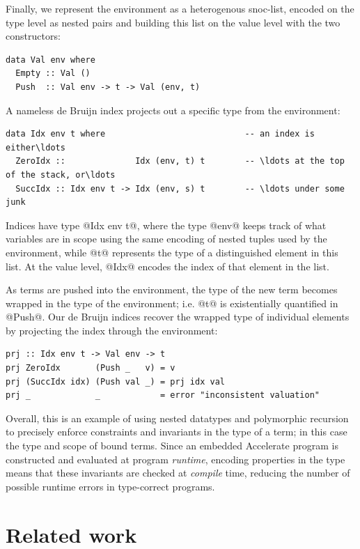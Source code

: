 Finally, we represent the environment as a heterogenous snoc-list, encoded on
the type level as nested pairs and building this list on the value level with
the two constructors:
%
\begin{lstlisting}[style=haskell]
data Val env where
  Empty :: Val ()
  Push  :: Val env -> t -> Val (env, t)
\end{lstlisting}
%
A nameless de Bruijn index projects out a specific type from the environment:
%
\begin{lstlisting}[style=haskell]
data Idx env t where                            -- an index is either\ldots
  ZeroIdx ::              Idx (env, t) t        -- \ldots at the top of the stack, or\ldots
  SuccIdx :: Idx env t -> Idx (env, s) t        -- \ldots under some junk
\end{lstlisting}
%
Indices have type @Idx env t@, where the type @env@ keeps track of what
variables are in scope using the same encoding of nested tuples used by the
environment, while @t@ represents the type of a distinguished element in this
list. At the value level, @Idx@ encodes the index of that element in the list.

As terms are pushed into the environment, the type of the new term becomes
wrapped in the type of the environment; i.e. @t@ is existentially quantified in
@Push@. Our de Bruijn indices recover the wrapped type of individual elements by
projecting the index through the environment:
%
\begin{lstlisting}[style=haskell]
prj :: Idx env t -> Val env -> t
prj ZeroIdx       (Push _   v) = v
prj (SuccIdx idx) (Push val _) = prj idx val
prj _             _            = error "inconsistent valuation"
\end{lstlisting}

Overall, this is an example of using nested datatypes and polymorphic recursion
to precisely enforce constraints and invariants in the type of a term; in this
case the type and scope of bound terms. Since an embedded Accelerate program is
constructed and evaluated at program \emph{runtime}, encoding properties in the
type means that these invariants are checked at \emph{compile} time, reducing
the number of possible runtime errors in type-correct programs.


\section{Related work}

